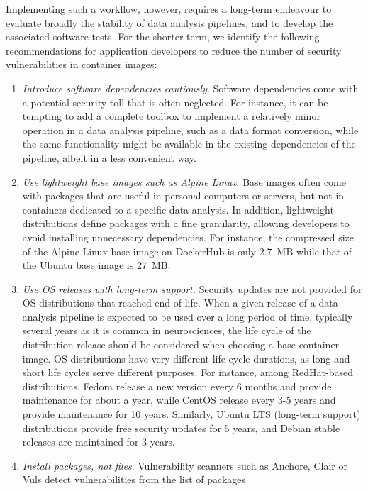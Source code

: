 Implementing such a workflow, however, requires a long-term endeavour to
evaluate broadly the stability of data analysis pipelines, and to develop
the associated software tests. For the shorter term, we identify the
following recommendations for application developers to reduce the number
of security vulnerabilities in container images:

\begin{enumerate}
\item \emph{Introduce software dependencies cautiously}. Software
dependencies come with a potential security toll that is often neglected.
For instance, it can be tempting to add a complete toolbox to implement a
relatively minor operation in a data analysis pipeline, such as a data
format conversion, while the same functionality might be available in the
existing dependencies of the pipeline, albeit in a less convenient way.
\item \emph{Use lightweight base images such as Alpine Linux}. Base
images often come with packages that are useful in personal computers or
servers, but not in containers dedicated to a specific data analysis. In
addition, lightweight distributions define packages with a fine
granularity, allowing developers to avoid installing unnecessary
dependencies. For instance, the compressed size of the Alpine Linux base
image on DockerHub is only 2.7~MB while that of the Ubuntu base image is
27~MB.
\item \emph{Use OS releases with long-term support.} Security updates are
not provided for OS distributions that reached end of life. When a given
release of a data analysis pipeline is expected to be used over a long
period of time, typically several years as it is common in neurosciences,
the life cycle of the distribution release should be considered when
choosing a base container image. OS distributions have very different life
cycle durations, as long and short life cycles serve different purposes.
For instance, among RedHat-based distributions, Fedora release a new version
every 6 months and provide maintenance for about a year, while CentOS
release every 3-5 years and provide maintenance for 10 years. Similarly,
Ubuntu LTS (long-term support) distributions provide free security updates
for 5 years, and Debian stable releases are maintained for 3 years.
\item \emph{Install packages, not files}. Vulnerability scanners such as
Anchore, Clair or Vuls detect vulnerabilities from the list of packages

\end{enumerate}
